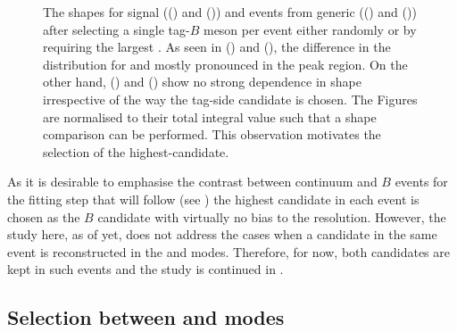 \begin{figure}[hbtp!]
{    The \Mbc shapes for \BtoXsgamma signal \MC (() and ()) 
    and \mbox{\epem\ra\qqbar} events from generic \MC (() and ()) after selecting a single tag-$B$ meson per event either randomly or by requiring the largest \feiProb.
    As seen in () and (), the difference in the \Mbc distribution for \BptoXsgamma and \BztoXsgamma mostly pronounced in the peak region.
    On the other hand, () and () show no strong dependence in shape irrespective of the way the tag-side candidate is chosen.
    The Figures are normalised to their total integral value such that a shape comparison can be performed.
    This observation motivates the selection of the highest-\feiProb candidate.
    }    
\end{figure}

As it is desirable to emphasise the contrast between continuum and $B$ events for the fitting step that will follow (see )
the highest \feiProb candidate in each event is chosen as the $B$ candidate with virtually no bias to the resolution.
However, the study here, as of yet, does not address the cases when a candidate in the same event is reconstructed in the \feiBp and \feiBz modes.
Therefore, for now, both candidates are kept in such events and the study is continued in .

\subsection{Selection between \texorpdfstring{\feiBp}{feiB+} and \texorpdfstring{\feiBz}{feiB0} modes}\label{sec:select_best_candidate}


